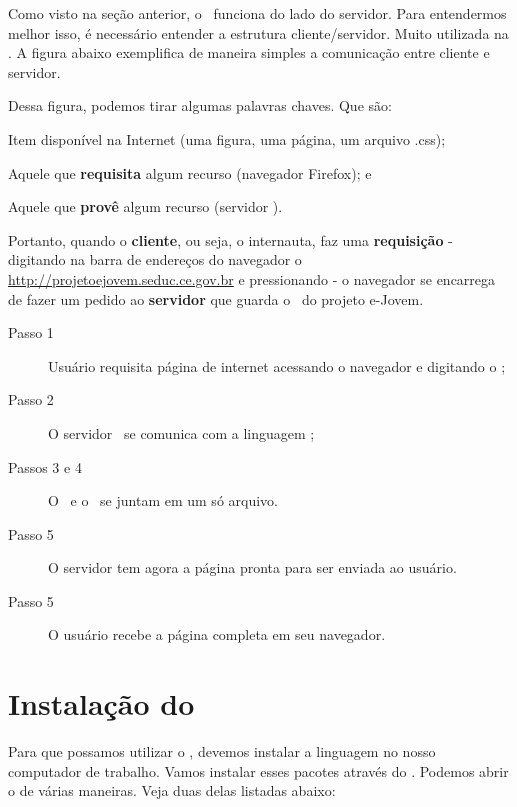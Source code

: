 Como visto na seção anterior, o \php~funciona do lado do servidor. Para entendermos
melhor isso, é necessário entender a estrutura cliente/servidor. Muito utilizada
na \internet. A figura abaixo exemplifica de maneira simples a comunicação entre
cliente e servidor.


Dessa figura, podemos tirar algumas palavras chaves. Que são:
\begin{description}[noitemsep]
  \item [Recurso] Item disponível na Internet (uma figura, uma página, um arquivo .css);
  \item [Cliente] Aquele que \textbf{requisita} algum recurso (navegador Firefox); e
  \item [Servidor] Aquele que \textbf{provê} algum recurso (servidor \apache).
\end{description}

Portanto, quando o \textbf{cliente}, ou seja, o internauta, faz uma \textbf{requisição} 
- digitando na barra de endereços do navegador o \site~
\url{http://projetoejovem.seduc.ce.gov.br} e pressionando  - o navegador 
se encarrega de fazer um pedido ao \textbf{servidor} que guarda o \site~do projeto e-Jovem.

\begin{description}
  \item [Passo 1] Usuário requisita página de internet acessando o navegador e digitando
  o \site;
  \item [Passo 2] O servidor \web~se comunica com a linguagem \php;
  \item [Passos 3 e 4] O \php~e o \html~se juntam em um só arquivo.
  \item [Passo 5] O servidor tem agora a página pronta para ser enviada ao usuário.
  \item [Passo 5] O usuário recebe a página completa em seu navegador.
\end{description}

\section{Instalação do \php}
\label{instalacao-do-php}

Para que possamos utilizar o \php, devemos instalar a linguagem no nosso computador
de trabalho. Vamos instalar esses pacotes através do \terminal. Podemos abrir o
\terminal de várias maneiras. Veja duas delas listadas abaixo:

